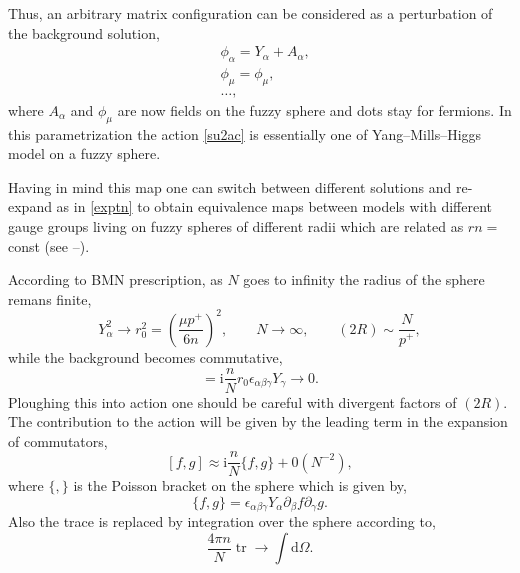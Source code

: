 \documentclass[a4paper]{article}
\newcommand{\ii}{\mathrm{i}}
\newcommand{\dd}{\mathrm{d}}
\newcommand{\pd}{\partial}
\newcommand{\tr}{\mathop{\mathrm{tr}}\nolimits}
\begin{document}
Thus, an arbitrary matrix configuration can be considered as a
perturbation of the background solution,
\begin{subequations}\label{exptn}
\begin{align}
& \phi_\alpha=Y_\alpha+A_\alpha, \\
& \phi_\mu=\phi_\mu,\\
& \dots,
\end{align}
\end{subequations}
where $A_\alpha$ and $\phi_\mu$ are now fields on the fuzzy sphere
and dots stay for fermions. In this parametrization the action
\eqref{su2ac} is essentially one of Yang--Mills--Higgs model on a
fuzzy sphere.

Having in mind this map one can switch between different solutions and
re-expand as in \eqref{exptn} to obtain equivalence maps between
models with different gauge groups living on fuzzy spheres of
different radii which are related as $rn=$const (see
\cite{Sochichiu:2000ud}\nocite{Sochichiu:2000bg,Sochichiu:2000kz,%
Kiritsis:2002py}--\cite{Sochichiu:2002jh}).

According to BMN prescription, as $N$ goes to infinity the radius of
the sphere remans finite,
\begin{equation}\label{N->infty}
Y_\alpha^2\to r_0^2=\left(\frac{\mu p^+}{6n}\right)^2,\qquad
N\to\infty, \qquad (2R)\sim \frac{N}{p^+},
\end{equation}
while the background becomes commutative,
\begin{equation}
[Y_\alpha,Y_\beta]=\ii
\frac{n}{N}r_0\epsilon_{\alpha\beta\gamma}Y_\gamma\to 0.
\end{equation}
Ploughing this into action one should be careful with divergent
factors of $(2R)$. The contribution to the action will be given by
the leading term in the expansion of commutators,
\begin{equation}\label{com->pb}
[f,g]\approx \ii\frac{n}{N}\{f,g\}+0(N^{-2}),
\end{equation}
where $\{,\}$ is the Poisson bracket on the sphere which is given by,
\begin{equation}\label{pb}
\{f,g\}=\epsilon_{\alpha\beta\gamma}Y_\alpha\pd_\beta f\pd_\gamma g.
\end{equation}
Also the trace is replaced by integration over the sphere according
to,
\begin{equation}\label{tr->int}
\frac{4\pi n}{N}\tr\to \int \dd \Omega.
\end{equation}
\end{document}
